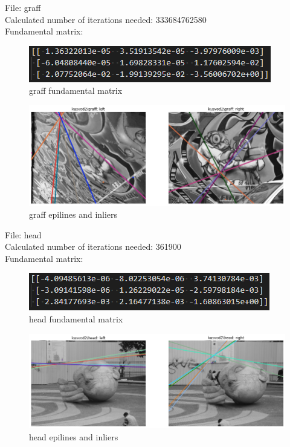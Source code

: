\documentclass[10pt,a4paper]{article}
\begin{document}
File: graff\\
Calculated number of iterations needed: 333684762580\\
Fundamental matrix:
\begin{figure}[H]
	\centering
	\includegraphics[width=0.7\linewidth]{img/grafff}
	\caption{graff fundamental matrix}
	\label{fig:grafff}
\end{figure}
\begin{figure}[H]
	\centering
	\includegraphics[width=0.7\linewidth]{img/graff}
	\caption{graff epilines and inliers}
	\label{fig:graff}
\end{figure}

File: head\\
Calculated number of iterations needed: 361900\\
Fundamental matrix:
\begin{figure}[H]
	\centering
	\includegraphics[width=0.7\linewidth]{img/headf}
	\caption{head fundamental matrix}
	\label{fig:headf}
\end{figure}
\begin{figure}[H]
	\centering
	\includegraphics[width=0.7\linewidth]{img/head}
	\caption{head epilines and inliers}
	\label{fig:head}
\end{figure}
\end{document}
